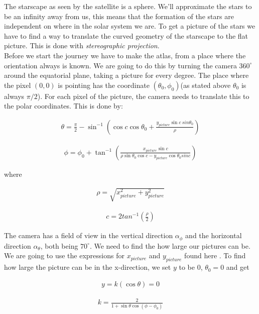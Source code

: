 \documentclass[a4paper, 10pt]{article}
\begin{document}
The starscape as seen by the satellite is a sphere. We'll approximate the stars to be an infinity away from us, this means that the formation of the stars are independent on where in the solar system we are. To get a picture of the stars we have to find a way to translate the curved geometry of the starscape to the flat picture. This is done with \textit{stereographic projection}\cite{part4}.\\

Before we start the journey we have to make the atlas, from a place where the orientation always is known. We are going to do this by turning the camera $360^\circ$ around the equatorial plane, taking a picture for every degree. The place where the pixel $(0,0)$ is pointing has the coordinate $(\theta_0,\phi_0)$(as stated above $\theta_0$ is always $\pi/2$). For each pixel of the picture, the camera needs to translate this to the polar coordinates. This is done by: 

\begin{align}
\theta = \frac{\pi}{2} - \sin^{-1}\left( \cos c \cos \theta_0 + \frac{y_{picture}\sin c\ sin \theta_0}{\rho} \right)
\end{align}

\begin{align}
\phi = \phi_0 + \tan^{-1} \left( \frac{x_{picture}\sin c}{\rho \sin \theta_0 \cos c - y_{picture}\cos \theta_0 sin c} \right)
\end{align}

where 

\begin{align}
\rho = \sqrt{x_{picture}^2 + y_{picture}^2}
\end{align}

\begin{align}
c = 2tan^{-1} \left( \frac{\rho}{2} \right)
\end{align}


The camera has a field of view in the vertical direction $\alpha_{\phi}$ and the horizontal direction $\alpha_{\theta}$, both being $70^\circ$. We need to find the how large our pictures can be. We are going to use the expressions for $x_{picture}$ and $y_{picture}$ found here \cite{part4}. To find how large the picture can be in the x-direction, we set $y$ to be $0$, $\theta_0 = 0$ and get

\begin{align}
y = k(\cos \theta ) = 0
\end{align}

\begin{align}
k = \frac{2}{1+\sin \theta \cos (\phi - \phi_0)}
\end{align}
\end{document}
